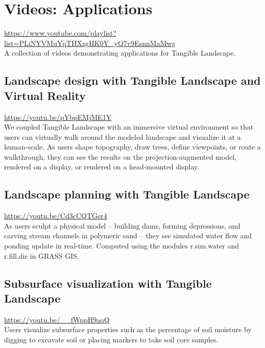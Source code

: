 \documentclass[prodmode,acmtochi]{acmsmall} %
\begin{document}
\vfill

\clearpage

\section{Videos: Applications}\label{appendix:application_videos}
\url{https://www.youtube.com/playlist?list=PLiNYVMuYqTHXzgHK0Y_yQ7v9EsnnMaMwg}\\

\noindent
A collection of videos demonstrating applications for Tangible Landscape.

\subsection{Landscape design with Tangible Landscape and Virtual Reality}\label{videos:tl_vr}
\url{https://youtu.be/pYbpEMjME1Y}\\

\noindent
We coupled Tangible Landscape with an immersive virtual environment so that users can virtually walk around the modeled landscape and visualize it at a human-scale. As users shape topography, draw trees, define viewpoints, or route a walkthrough, they can see the results on the projection-augmented model, rendered on a display, or rendered on a head-mounted display.

\subsection{Landscape planning with Tangible Landscape}\label{videos:flow}
\url{https://youtu.be/Cd3cCQTGer4}\\

\noindent
As users sculpt a physical model -- building dams, forming depressions, and carving stream channels in polymeric sand -- they see simulated water flow and ponding update in real-time. Computed using the modules r.sim.water and r.fill.dir in GRASS GIS.

\subsection{Subsurface visualization with Tangible Landscape}\label{videos:subsurface}
\url{https://youtu.be/__fWppH9aqQ}\\

\noindent
Users visualize subsurface properties such as the percentage of soil moisture by digging to excavate soil or placing markers to take soil core samples. 
\end{document}
